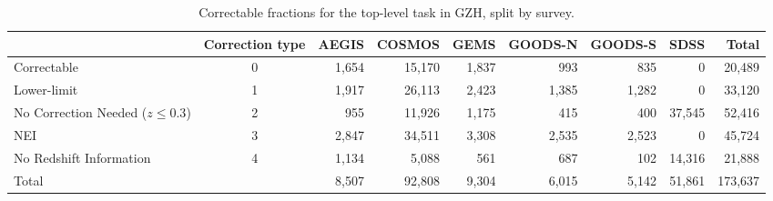 \documentclass[twocolumn]{aastex6}
\begin{document}
\begin{table}
\caption{Correctable fractions for the top-level task in GZH, split by survey.}\label{tbl:hubble_debiasable}
\begin{tabular}{lcrrrrrrr}
\hline\hline
                                   & Correction type & AEGIS   & COSMOS & GEMS & GOODS-N & GOODS-S    & SDSS    & Total \\
\hline
Correctable                        & 0               & 1,654   & 15,170 & 1,837 & 993    & 835     	& 0       & 20,489\\
Lower-limit                        & 1               & 1,917   & 26,113 & 2,423 & 1,385  & 1,282   	& 0       & 33,120\\
No Correction Needed ($z \le 0.3$) & 2               & 955     & 11,926 & 1,175 & 415    & 400     	& 37,545  & 52,416\\ 
NEI                                & 3               & 2,847   & 34,511 & 3,308 & 2,535  & 2,523   	& 0       & 45,724\\
No Redshift Information            & 4               & 1,134   & 5,088  & 561   & 687    & 102   		& 14,316  & 21,888\\
\hline
Total                              &                 & 8,507   & 92,808 & 9,304 & 6,015  & 5,142   	& 51,861  & 173,637\\
\hline\hline
\end{tabular}
\end{table}

\end{document}
